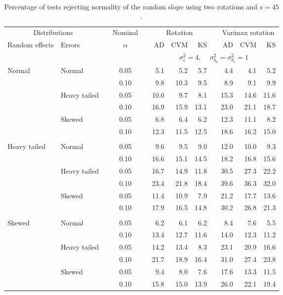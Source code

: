 \begin{table}[ht]
\centering
\caption{\label{tab:fixedsimb145} Percentage of tests rejecting normality of the random slope using two rotations and $s = 45$.}
\begin{scriptsize}
\begin{tabular}{ll p{.1cm} c p{.1cm} rrr p{.1cm} rrr}
  \hline
  \multicolumn{2}{c}{Distributions}& & Nominal & &  \multicolumn{3}{c}{Rotation} & & \multicolumn{3}{c}{Varimax rotation} \\ \cline{1-2} \cline{6-8} \cline{10-12}   
  Random effects & Errors & & $\alpha$ & & AD & CVM & KS & & AD & CVM & KS \\ 
   \hline
& && && \multicolumn{7}{c}{$\sigma_{\varepsilon}^2 = 4$, \ \ $\sigma_{b_0}^2 = \sigma_{b_1}^2 = 1$} \\ \cline{6-12}
\rowcolor{gray!20} Normal & Normal &  & 0.05 &  & 5.1 & 5.2 & 5.7 &  & 4.4 & 4.1 & 5.2 \\ 
\rowcolor{gray!20}    &  &  & 0.10 &  & 9.8 & 10.3 & 9.5 &  & 8.9 & 9.1 & 9.9 \\ 
\rowcolor{gray!20}    & Heavy tailed &  & 0.05 &  & 10.0 & 9.7 & 8.1 &  & 15.3 & 14.6 & 11.6 \\ 
\rowcolor{gray!20}    &  &  & 0.10 &  & 16.9 & 15.9 & 13.1 &  & 23.0 & 21.1 & 18.7 \\ 
\rowcolor{gray!20}    & Skewed &  & 0.05 &  & 6.8 & 6.4 & 6.2 &  & 12.3 & 11.1 & 8.2 \\ 
\rowcolor{gray!20}    &  &  & 0.10 &  & 12.3 & 11.5 & 12.5 &  & 18.6 & 16.2 & 15.0 \\ 
&&&&&&&&&&&\\
  Heavy tailed & Normal &  & 0.05 &  & 9.6 & 9.5 & 9.0 &  & 12.0 & 10.0 & 9.3 \\ 
   &  &  & 0.10 &  & 16.6 & 15.1 & 14.5 &  & 18.2 & 16.8 & 15.6 \\ 
   & Heavy tailed &  & 0.05 &  & 16.7 & 14.9 & 11.8 &  & 30.5 & 27.3 & 22.2 \\ 
   & &  & 0.10 &  & 23.4 & 21.8 & 18.4 &  & 39.6 & 36.3 & 32.0 \\ 
   & Skewed &  & 0.05 &  & 11.4 & 10.9 & 7.9 &  & 21.2 & 17.7 & 13.6 \\ 
   &  &  & 0.10 &  & 17.9 & 16.5 & 14.8 &  & 30.2 & 26.8 & 21.3 \\ 
&&&&&&&&&&&\\
  Skewed & Normal &  & 0.05 &  & 6.2 & 6.1 & 6.2 &  & 8.4 & 7.6 & 5.5 \\ 
   &  &  & 0.10 &  & 13.4 & 12.7 & 11.6 &  & 14.0 & 12.3 & 11.2 \\ 
   & Heavy tailed &  & 0.05 &  & 14.2 & 13.4 & 8.3 &  & 23.1 & 20.9 & 16.6 \\ 
   &  &  & 0.10 &  & 21.7 & 18.9 & 16.4 &  & 31.0 & 27.4 & 23.8 \\ 
   & Skewed &  & 0.05 &  & 9.4 & 8.0 & 7.6 &  & 17.6 & 13.3 & 11.5 \\ 
   &  &  & 0.10 &  & 15.8 & 15.0 & 13.9 &  & 26.0 & 22.1 & 19.4 \\ 


\end{tabular}
\end{scriptsize}
\end{table}
